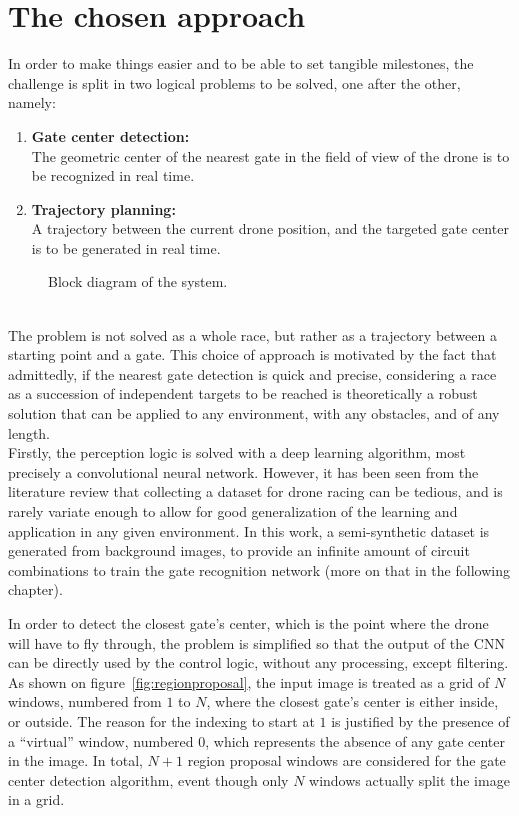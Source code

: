 \section{The chosen approach}

In order to make things easier and to be able to set tangible milestones, the
challenge is split in two logical problems to be solved, one after the
other, namely:
\begin{enumerate}
	\item{\textbf{Gate center detection:\\}
			The geometric center of the nearest gate in the field of view of the
			drone is to be recognized in real time.
	}
	\item{\textbf{Trajectory planning:\\}
			A trajectory between the current drone position, and the targeted gate
			center is to be generated in real time.
	}
\end{enumerate}

\begin{figure}[h!]
	\centering
	
	\caption{Block diagram of the system.}
	\label{fig:block-system}
\end{figure}

~\\The problem is not solved as a whole race, but rather as a trajectory
between a starting point and a gate. This choice of approach is motivated by
the fact that admittedly, if the nearest gate detection is quick and precise,
considering a race as a succession of independent targets to be reached is
theoretically a robust solution that can be applied to any environment, with any
obstacles, and of any length.\\

Firstly, the perception logic is solved with a deep learning algorithm, most
precisely a convolutional neural network. However, it has been seen from
the literature review that collecting a dataset for drone racing can be
tedious, and is rarely variate enough to allow for good generalization of the
learning and application in any given environment. In this work, a
semi-synthetic dataset is generated from background images, to provide an
infinite amount of circuit combinations to train the gate recognition network
(more on that in the following chapter).

In order to detect the closest gate's center, which is the point where the
drone will have to fly through, the problem is simplified so that the output of
the CNN can be directly used by the control logic, without any processing,
except filtering. As shown on figure~\ref{fig:regionproposal}, the input image
is treated as a grid of $N$ windows, numbered from $1$ to $N$, where the
closest gate's center is either inside, or outside. The reason for the indexing
to start at $1$ is justified by the presence of a ``virtual'' window, numbered
$0$, which represents the absence of any gate center in the image. In total,
$N+1$ region proposal windows are considered for the gate center detection
algorithm, event though only $N$ windows actually split the image in a grid.

